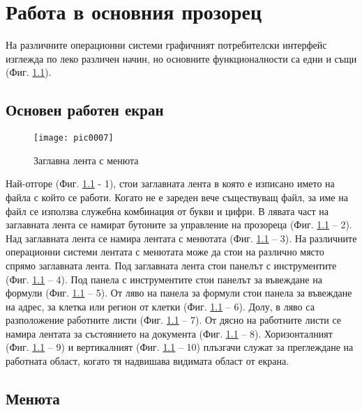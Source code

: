 ﻿\newpage
\chapter{Работа в основния прозорец}
\label{chapter02}

На различните операционни системи графичният потребителски интерфейс изглежда по леко различен начин, но основните функционалности са едни и същи (Фиг. \ref{figure0007}).

\section{Основен работен екран}

\begin{figure}[h!]
  \centering
  \texttt{[image: pic0007]}
  \caption{Заглавна лента с менюта}
\label{figure0007}
\end{figure}
\FloatBarrier

Най-отгоре (Фиг. \ref{figure0007} - 1), стои заглавната лента в която е изписано името на файла с който се работи. Когато не е зареден вече съществуващ файл, за име на файл се използва служебна комбинация от букви и цифри. В лявата част на заглавната лента се намират бутоните за управление на прозореца (Фиг. \ref{figure0007} – 2). Над заглавната лента се намира лентата с менютата (Фиг. \ref{figure0007} – 3). На различните операционни системи лентата с менютата може да стои на различно място спрямо заглавната лента. Под заглавната лента стои панелът с инструментите (Фиг. \ref{figure0007} – 4). Под панела с инструментите стои панелът за въвеждане на формули (Фиг. \ref{figure0007} – 5). От ляво на панела за формули стои панела за въвеждане на адрес, за клетка или регион от клетки (Фиг. \ref{figure0007} – 6). Долу, в ляво са разположение работните листи (Фиг. \ref{figure0007} – 7). От дясно на работните листи се намира лентата за състоянието на документа (Фиг. \ref{figure0007} – 8). Хоризонталният (Фиг. \ref{figure0007} – 9) и вертикалният (Фиг. \ref{figure0007} – 10) плъзгачи служат за преглеждане на работната област, когато тя надвишава видимата област от екрана. 

\section{Менюта}


